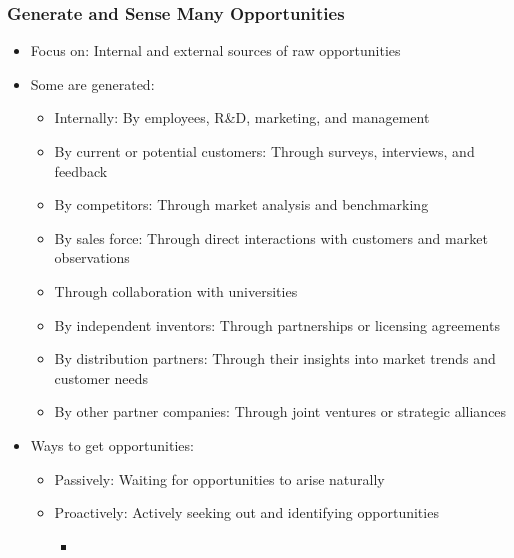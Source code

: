 \documentclass[openany,12pt,a4paper]{book}
\begin{document}
\subsubsection{Generate and Sense Many Opportunities}
\begin{itemize}
    \item Focus on: Internal and external sources of raw opportunities
    \item Some are generated:
    \begin{itemize}
        \item Internally: By employees, R\&D, marketing, and management
        \item By current or potential customers: Through surveys, interviews, and feedback
        \item By competitors: Through market analysis and benchmarking
        \item By sales force: Through direct interactions with customers and market observations
        \item Through collaboration with universities
        \item By independent inventors: Through partnerships or licensing agreements
        \item By distribution partners: Through their insights into market trends and customer needs
        \item By other partner companies: Through joint ventures or strategic alliances
    \end{itemize}
    \item Ways to get opportunities:
    \begin{itemize}
        \item Passively: Waiting for opportunities to arise naturally
        \item Proactively: Actively seeking out and identifying opportunities
        \begin{itemize}
            \item 
        \end{itemize}
    \end{itemize}
\end{itemize}
\end{document}
